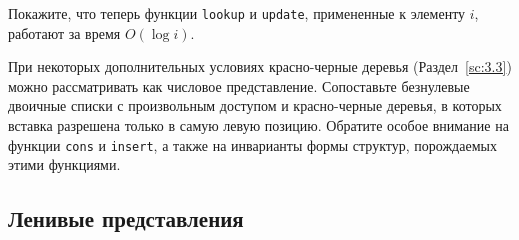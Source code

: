 \ifanswers
\begin{frame}[fragile]{}
\begin{exercise}\label{ex:9.6}
  Покажите, что теперь функции \lstinline!lookup! и
  \lstinline!update!, примененные к элементу $i$, работают за время
  $O(\log i)$.
\end{exercise}

\begin{exercise}\label{ex:9.7}
  При некоторых дополнительных условиях красно-черные деревья
  (Раздел~\ref{sc:3.3}) можно рассматривать как числовое
  представление. Сопоставьте безнулевые двоичные списки с произвольным
  доступом и красно-черные деревья, в которых вставка разрешена только
  в самую левую позицию. Обратите особое внимание на функции
  \lstinline!cons! и \lstinline!insert!, а также на инварианты формы
  структур, порождаемых этими функциями.
\end{exercise}
\end{frame}
\fi


\subsection{Ленивые представления}
\label{sc:9.2.3}

